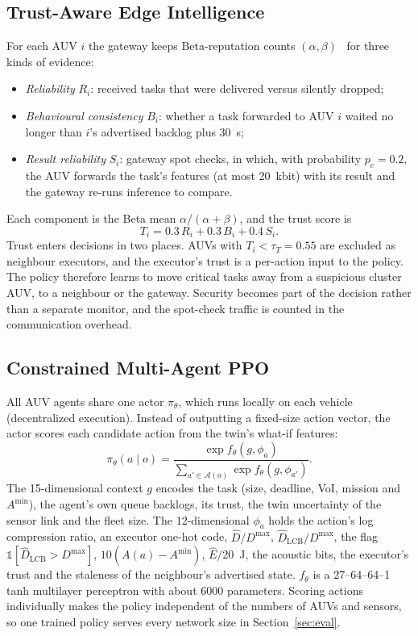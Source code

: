 \documentclass[lettersize,journal]{IEEEtran}
\newcommand{\Dmax}{D^{\max}}
\newcommand{\Amin}{A^{\min}}
\begin{document}
\subsection{Trust-Aware Edge Intelligence}
For each AUV $i$ the gateway keeps Beta-reputation counts $(\alpha,\beta)$~\cite{josang2002beta} for three kinds of evidence:
\begin{itemize}
\item \emph{Reliability} $R_i$: received tasks that were delivered versus silently dropped;
\item \emph{Behavioural consistency} $B_i$: whether a task forwarded to AUV $i$ waited no longer than $i$'s advertised backlog plus 30~s;
\item \emph{Result reliability} $S_i$: gateway spot checks, in which, with probability $p_c=0.2$, the AUV forwards the task's features (at most 20~kbit) with its result and the gateway re-runs inference to compare.
\end{itemize}
Each component is the Beta mean $\alpha/(\alpha+\beta)$, and the trust score is
\begin{equation}
T_i = 0.3\,R_i + 0.3\,B_i + 0.4\,S_i .
\end{equation}
Trust enters decisions in two places. AUVs with $T_i<\tau_T=0.55$ are excluded as neighbour executors, and the executor's trust is a per-action input to the policy. The policy therefore learns to move critical tasks away from a suspicious cluster AUV, to a neighbour or the gateway. Security becomes part of the decision rather than a separate monitor, and the spot-check traffic is counted in the communication overhead.

\subsection{Constrained Multi-Agent PPO}
All AUV agents share one actor $\pi_\theta$, which runs locally on each vehicle (decentralized execution). Instead of outputting a fixed-size action vector, the actor scores each candidate action from the twin's what-if features:
\begin{equation}
\pi_\theta(a \mid o) = \frac{\exp f_\theta(g, \phi_a)}{\sum_{a' \in \mathcal{A}(o)} \exp f_\theta(g, \phi_{a'})}.
\end{equation}
The 15-dimensional context $g$ encodes the task (size, deadline, VoI, mission and $\Amin$), the agent's own queue backlogs, its trust, the twin uncertainty of the sensor link and the fleet size. The 12-dimensional $\phi_a$ holds the action's log compression ratio, an executor one-hot code, $\hat D/\Dmax$, $\hat D_{\mathrm{LCB}}/\Dmax$, the flag $\mathbb{1}[\hat D_{\mathrm{LCB}}>\Dmax]$, $10(A(a)-\Amin)$, $\hat E/20$~J, the acoustic bits, the executor's trust and the staleness of the neighbour's advertised state. $f_\theta$ is a 27--64--64--1 tanh multilayer perceptron with about 6000 parameters. Scoring actions individually makes the policy independent of the numbers of AUVs and sensors, so one trained policy serves every network size in Section~\ref{sec:eval}.
\end{document}
